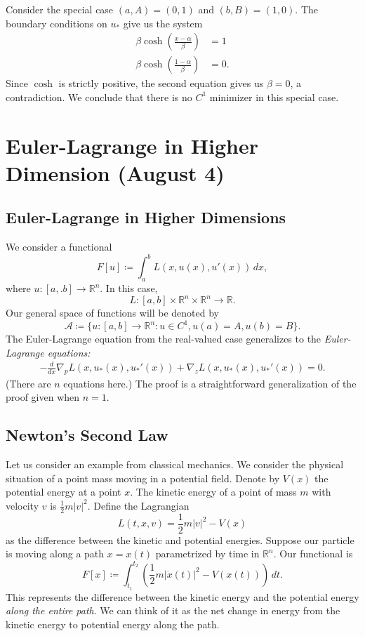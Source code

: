 \documentclass[11pt]{article}
\newcommand{\R}{\mathbb{R}}
\begin{document}
\begin{enumerate}
Consider the special case $(a,A) = (0, 1)$ and $(b, B) = (1,0)$. The boundary conditions on $u_*$ give us the system
\begin{align*}
\beta \cosh \left( \frac{x - \alpha}{\beta} \right) &= 1 \\
\beta \cosh\left( \frac{1 - \alpha}{\beta} \right) &= 0.
\end{align*}
Since $\cosh$ is strictly positive, the second equation gives us $\beta = 0$, a contradiction. We conclude that there is no $C^1$ minimizer in this special case.
\end{enumerate}

\newpage

\section{Euler-Lagrange in Higher Dimension (August 4)}

\subsection{Euler-Lagrange in Higher Dimensions}

We consider a functional
\[
F[u] \coloneqq \int_a^b L(x, u(x), u'(x)) \, dx,
\]
where $u : [a,.b] \to \R^n$. In this case,
\[
L : [a, b] \times \R^n \times \R^n \to \R.
\]
Our general space of functions will be denoted by 
\[
\mathcal{A} \coloneqq \{ u : [a,b] \to \R^n : u \in C^1, u(a) = A, u(b) = B \}.
\]
The Euler-Lagrange equation from the real-valued case generalizes to the \emph{Euler-Lagrange equations:}
\begin{align*}
-\frac{d}{dx} \nabla_p L(x, u_*(x), u_*'(x)) + \nabla_z L(x, u_*(x), u_*'(x)) = 0.
\end{align*}
(There are $n$ equations here.) The proof is a straightforward generalization of the proof given when $n = 1$.

\subsection{Newton's Second Law}

Let us consider an example from classical mechanics. We consider the physical situation of a point mass moving in a potential field. Denote by $V(x)$ the potential energy at a point $x$. The kinetic energy of a point of mass $m$ with velocity $v$ is $\frac{1}{2} m |v|^2$. Define the Lagrangian
\[
L(t,x,v) = \frac{1}{2} m |v|^2 - V(x)
\]
as the difference between the kinetic and potential energies. Suppose our particle is moving along a path $x = x(t)$ parametrized by time in $\R^n$. Our functional is
\[
F[x] \coloneqq \int_{t_1}^{t_2} \left( \frac{1}{2} m |\dot{x}(t)|^2 - V(x(t)) \right) \, dt.
\]
This represents the difference between the kinetic energy and the potential energy \emph{along the entire path}. We can think of it as the net change in energy from the kinetic energy to potential energy along the path.
\end{document}
